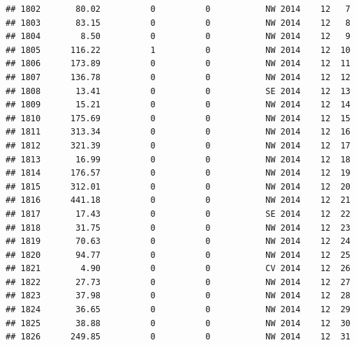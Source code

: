 \documentclass[
]{article}
\begin{document}
\begin{verbatim}
## 1802       80.02          0          0           NW 2014    12   7
## 1803       83.15          0          0           NW 2014    12   8
## 1804        8.50          0          0           NW 2014    12   9
## 1805      116.22          1          0           NW 2014    12  10
## 1806      173.89          0          0           NW 2014    12  11
## 1807      136.78          0          0           NW 2014    12  12
## 1808       13.41          0          0           SE 2014    12  13
## 1809       15.21          0          0           NW 2014    12  14
## 1810      175.69          0          0           NW 2014    12  15
## 1811      313.34          0          0           NW 2014    12  16
## 1812      321.39          0          0           NW 2014    12  17
## 1813       16.99          0          0           NW 2014    12  18
## 1814      176.57          0          0           NW 2014    12  19
## 1815      312.01          0          0           NW 2014    12  20
## 1816      441.18          0          0           NW 2014    12  21
## 1817       17.43          0          0           SE 2014    12  22
## 1818       31.75          0          0           NW 2014    12  23
## 1819       70.63          0          0           NW 2014    12  24
## 1820       94.77          0          0           NW 2014    12  25
## 1821        4.90          0          0           CV 2014    12  26
## 1822       27.73          0          0           NW 2014    12  27
## 1823       37.98          0          0           NW 2014    12  28
## 1824       36.65          0          0           NW 2014    12  29
## 1825       38.88          0          0           NW 2014    12  30
## 1826      249.85          0          0           NW 2014    12  31
\end{verbatim}
\end{document}
